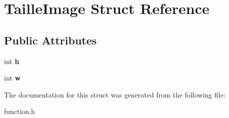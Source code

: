 \hypertarget{structTailleImage}{}\section{Taille\+Image Struct Reference}
\label{structTailleImage}
\subsection*{Public Attributes}
\begin{DoxyCompactItemize}
\item 
\mbox{\label{structTailleImage_aed08f2e902fc5e6954b56aec11f61384}} 
int {\bfseries h}
\item 
\mbox{\label{structTailleImage_abd229f798b7e6948192fae43855bd85e}} 
int {\bfseries w}
\end{DoxyCompactItemize}


The documentation for this struct was generated from the following file\+:\begin{DoxyCompactItemize}
\item 
function.\+h\end{DoxyCompactItemize}
